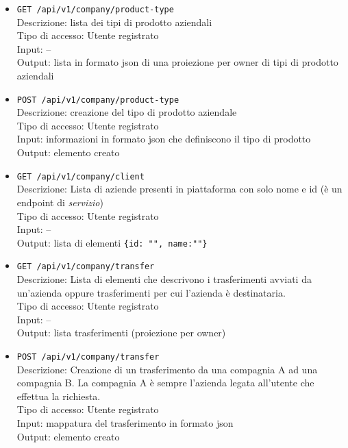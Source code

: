 \documentclass[a4paper,11pt]{article}
\begin{document}
\begin{itemize}
  \item \texttt{GET /api/v1/company/product-type}
        \\ Descrizione: lista dei tipi di prodotto aziendali
        \\ Tipo di accesso: Utente registrato
        \\ Input: --
        \\ Output: lista in formato json di una proiezione per owner di tipi di prodotto aziendali

  \item \texttt{POST /api/v1/company/product-type}
        \\ Descrizione: creazione del tipo di prodotto aziendale
        \\ Tipo di accesso:  Utente registrato
        \\ Input: informazioni in formato json che definiscono il tipo di prodotto
        \\ Output: elemento creato

  \item \texttt{GET /api/v1/company/client}
        \\ Descrizione: Lista di aziende presenti in piattaforma con solo nome e id (è un endpoint di \textit{servizio})
        \\ Tipo di accesso: Utente registrato
        \\ Input: --
        \\ Output: lista di elementi \texttt{\{id: "", name:""\}}

  \item \texttt{GET /api/v1/company/transfer}
        \\ Descrizione: Lista di elementi che descrivono i trasferimenti avviati da un'azienda oppure trasferimenti per cui l'azienda è destinataria.
        \\ Tipo di accesso: Utente registrato
        \\ Input: --
        \\ Output: lista trasferimenti (proiezione per owner)

  \item \texttt{POST /api/v1/company/transfer}
        \\ Descrizione: Creazione di un trasferimento da una compagnia A ad una compagnia B. La compagnia A è sempre l'azienda legata all'utente che effettua la richiesta.
        \\ Tipo di accesso: Utente registrato
        \\ Input: mappatura del trasferimento in formato json
        \\ Output: elemento creato


\end{itemize}
\end{document}
